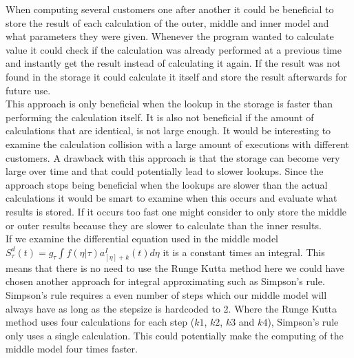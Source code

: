 



When computing several customers one after another it could be beneficial to store the result of each calculation of the outer, middle and inner model and what parameters they were given. Whenever the program wanted to calculate value it could check if the calculation was already performed at a previous time and instantly get the result instead of calculating it again. If the result was not found in the storage it could calculate it itself and store the result afterwards for future use. \\ 

This approach is only beneficial when the lookup in the storage is faster than performing the calculation itself. It is also not beneficial if the amount of calculations that are identical, is not large enough. It would be interesting to examine the calculation collision with a large amount of executions with different customers. A drawback with this approach is that the storage can become very large over time and that could potentially lead to slower lookups. Since the approach stops being beneficial when the lookups are slower than the actual calculations it would be smart to examine when this occurs and evaluate what results is stored. If it occurs too fast one might consider to only store the middle or outer results because they are slower to calculate than the inner results. \\

If we examine the differential equation used in the middle model \\$S_\tau^d(t) = g_\tau \int f(\eta|\tau)a_{[\eta] + k}^I(t)d\eta$ it is a constant times an integral. This means that there is no need to use the Runge Kutta method here we could have chosen another approach for integral approximating such as Simpson's rule\cite{simp}. Simpson's rule requires a even number of steps which our middle model will always have as long as the stepsize is hardcoded to 2. Where the Runge Kutta method uses four calculations for each step ($k1$, $k2$, $k3$ and $k4$), Simpson's rule only uses a single calculation. This could potentially make the computing of the middle model four times faster. 
